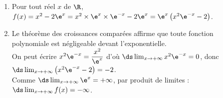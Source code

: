 \medskip

\begin{enumerate}
\item Pour tout réel $x$ de $\R$, $f(x)= x^2 - 2\e^{x} = x^2\times \e^{x} \times \e^{-x}- 2\e^{x} = \e^{x}\left(x^2\e^{-x} - 2\right)$.

\item Le théorème des croissances comparées affirme que toute fonction polynomiale est négligeable devant l'exponentielle.\\On peut écrire $x^2\e^{-x} = \dfrac{x^2}{\e^x}$ d'où $\ds\lim_{x\to +\infty} x^2\e^{-x} = 0$, donc $\ds\lim_{x\to +\infty} \left(x^2\e^{-x} - 2\right) = -2 $.\\Comme $\ds\lim_{x\to +\infty} \e^{x} = + \infty$, par produit de limites : $\ds\lim_{x\to +\infty} f(x) = - \infty$.
\end{enumerate}

\bigskip
